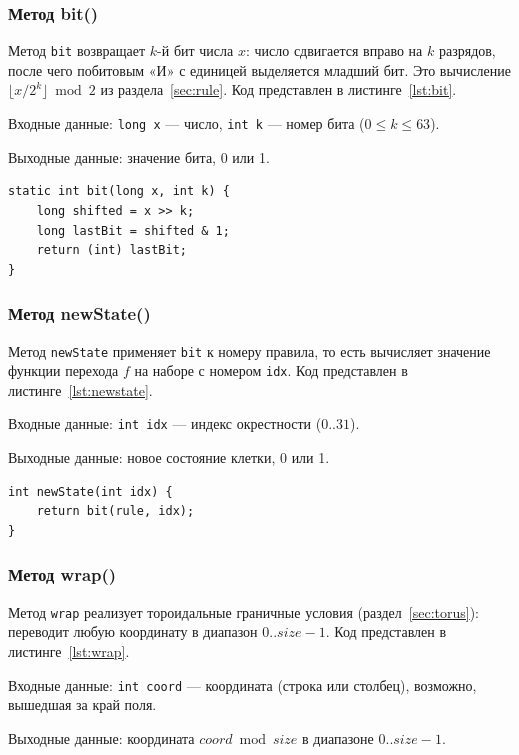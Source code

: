 \documentclass[a4paper,14pt]{extarticle}
\begin{document}
\subsubsection*{Метод bit()}

Метод \texttt{bit} возвращает $k$-й бит числа $x$: число сдвигается вправо на $k$ разрядов, после чего побитовым «И» с единицей выделяется младший бит. Это вычисление $\lfloor x / 2^k \rfloor \bmod 2$ из раздела~\ref{sec:rule}. Код представлен в листинге~\ref{lst:bit}.

Входные данные: \texttt{long x} --- число, \texttt{int k} --- номер бита ($0 \le k \le 63$).

Выходные данные: значение бита, 0 или 1.

\begin{lstlisting}[caption={Метод bit()}, label={lst:bit}]
static int bit(long x, int k) {
	long shifted = x >> k;
	long lastBit = shifted & 1;
	return (int) lastBit;
}
\end{lstlisting}

\subsubsection*{Метод newState()}

Метод \texttt{newState} применяет \texttt{bit} к номеру правила, то есть вычисляет значение функции перехода $f$ на наборе с номером \texttt{idx}. Код представлен в листинге~\ref{lst:newstate}.

Входные данные: \texttt{int idx} --- индекс окрестности ($0..31$).

Выходные данные: новое состояние клетки, 0 или 1.

\begin{lstlisting}[caption={Метод newState()}, label={lst:newstate}]
int newState(int idx) {
	return bit(rule, idx);
}
\end{lstlisting}

\subsubsection*{Метод wrap()}

Метод \texttt{wrap} реализует тороидальные граничные условия (раздел~\ref{sec:torus}): переводит любую координату в диапазон $0..size-1$. Код представлен в листинге~\ref{lst:wrap}.

Входные данные: \texttt{int coord} --- координата (строка или столбец), возможно, вышедшая за край поля.

Выходные данные: координата $coord \bmod size$ в диапазоне $0..size-1$.
\end{document}
